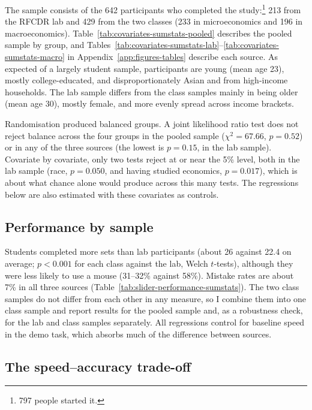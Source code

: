 \documentclass[12pt, letterpaper]{article}
\begin{document}
The sample consists of the 642 participants who completed the study:\footnote{797 people started it.} 213 from the RFCDR lab and 429 from the two classes (233 in microeconomics and 196 in macroeconomics). Table~\ref{tab:covariates-sumstats-pooled} describes the pooled sample by group, and Tables~\ref{tab:covariates-sumstats-lab}--\ref{tab:covariates-sumstats-macro} in Appendix~\ref{app:figures-tables} describe each source. As expected of a largely student sample, participants are young (mean age 23), mostly college-educated, and disproportionately Asian and from high-income households. The lab sample differs from the class samples mainly in being older (mean age 30), mostly female, and more evenly spread across income brackets.

Randomisation produced balanced groups. A joint likelihood ratio test does not reject balance across the four groups in the pooled sample ($\chi^2 = 67.66$, $p = 0.52$) or in any of the three sources (the lowest is $p = 0.15$, in the lab sample). Covariate by covariate, only two tests reject at or near the 5\% level, both in the lab sample (race, $p = 0.050$, and having studied economics, $p = 0.017$), which is about what chance alone would produce across this many tests. The regressions below are also estimated with these covariates as controls.

\subsection{Performance by sample}

Students completed more sets than lab participants (about 26 against 22.4 on average; $p < 0.001$ for each class against the lab, Welch $t$-tests), although they were less likely to use a mouse (31--32\% against 58\%). Mistake rates are about 7\% in all three sources (Table~\ref{tab:slider-performance-sumstats}). The two class samples do not differ from each other in any measure, so I combine them into one class sample and report results for the pooled sample and, as a robustness check, for the lab and class samples separately. All regressions control for baseline speed in the demo task, which absorbs much of the difference between sources.

\subsection{The speed--accuracy trade-off}
\end{document}
